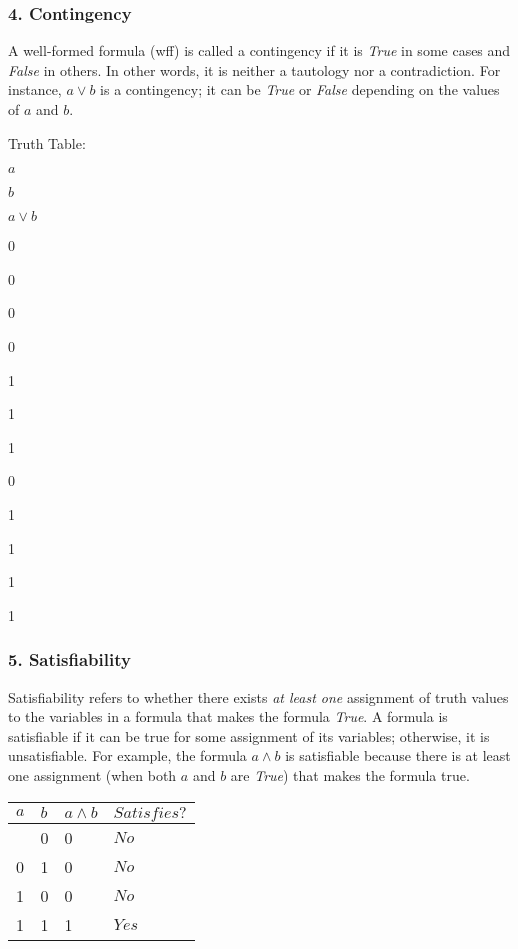 \subsubsection{4. Contingency}\label{contingency}

A well-formed formula (wff) is called a contingency if it is \emph{True}
in some cases and \emph{False} in others. In other words, it is neither
a tautology nor a contradiction. For instance, \(a \lor b\) is a
contingency; it can be \emph{True} or \emph{False} depending on the
values of \(a\) and \(b\).

Truth Table:

\(a\)

\(b\)

\(a \lor b\)

0

0

0

0

1

1

1

0

1

1

1

1

\subsubsection{5. Satisfiability}\label{satisfiability}

Satisfiability refers to whether there exists \emph{at least one}
assignment of truth values to the variables in a formula that makes the
formula \emph{True}. A formula is satisfiable if it can be true for some
assignment of its variables; otherwise, it is unsatisfiable. For
example, the formula \(a \land b\) is satisfiable because there is at
least one assignment (when both \(a\) and \(b\) are \emph{True}) that
makes the formula true.

\begin{longtable}[]{@{}llll@{}}
\toprule\noalign{}
\(a\) & \(b\) & \(a \land b\) & \(Satisfies?\) \\
\midrule\noalign{}
\endhead
\bottomrule\noalign{}
\endlastfoot
0 & 0 & 0 & \(No\) \\
0 & 1 & 0 & \(No\) \\
1 & 0 & 0 & \(No\) \\
1 & 1 & 1 & \(Yes\) \\
\end{longtable}

